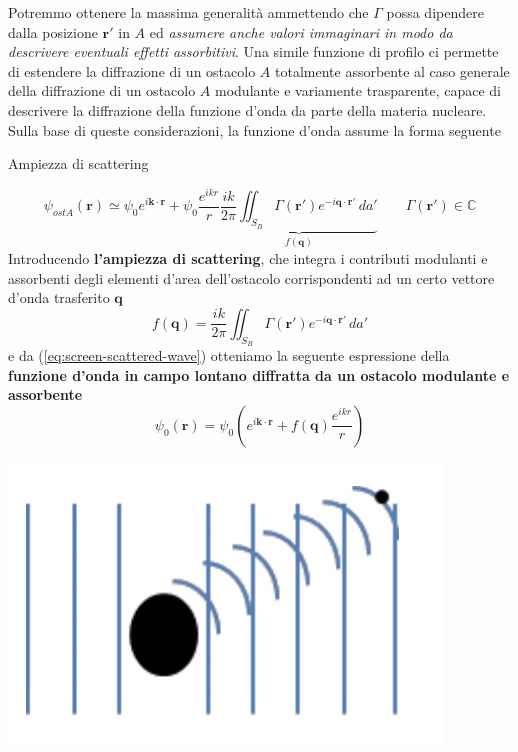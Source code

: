 Potremmo ottenere la massima generalità ammettendo che $\Gamma$ possa dipendere dalla posizione $\bm{r}'$ in $A$ ed
\emph{assumere anche valori immaginari in modo da descrivere eventuali effetti assorbitivi}.
Una simile funzione di profilo ci permette di estendere la diffrazione di un ostacolo $A$ totalmente assorbente al caso
generale della diffrazione di un ostacolo $A$ modulante e variamente trasparente, capace di descrivere la diffrazione della funzione d'onda da parte della materia nucleare.
Sulla base di queste considerazioni, la funzione d'onda assume la forma seguente
\begin{marginfigure} Ampiezza di scattering \end{marginfigure}
\[
	\psi_{ost A}(\bm{r}) \simeq \psi_0 e^{i \bm{k} \cdot \bm{r}} + \psi_0 \frac{e^{ikr}}{r} \underbrace{\frac{ik}{2 \pi}
	\iint_{S_B} \Gamma(\bm{r}') e^{-i \bm{q} \cdot \bm{r'}} \, da'}_{f(\bm{q})}
	\qquad \Gamma(\bm{r}') \in \mathbb{C}
\]
Introducendo \textbf{l'ampiezza di scattering}, che integra i contributi modulanti e assorbenti degli elementi d'area dell'ostacolo corrispondenti ad un certo vettore d'onda trasferito $\bm{q}$
\begin{equation}
	f(\bm{q}) = \frac{ik}{2 \pi} \iint_{S_B} \Gamma(\bm{r}')e^{-i \bm{q} \cdot \bm{r}'} \, da'
    \label{eq:scattering-amplitude}
\end{equation}
e da (\ref{eq:screen-scattered-wave}) otteniamo la seguente espressione della \textbf{funzione d'onda in campo lontano diffratta da un ostacolo modulante e assorbente}
\begin{equation}
	\psi_0(\bm{r}) = \psi_0 \left(e^{i \bm{k} \cdot \bm{r}} +
	f(\bm{q}) \frac{e^{ikr}}{r}\right)
	\label{eq:far-field-obstacle-scattered-wave}
\end{equation}
\begin{marginfigure}
	\centering
	\includegraphics{figs/kirchhoff-diffraction-4}
	\label{fig:kirchhoff4}
\end{marginfigure}
